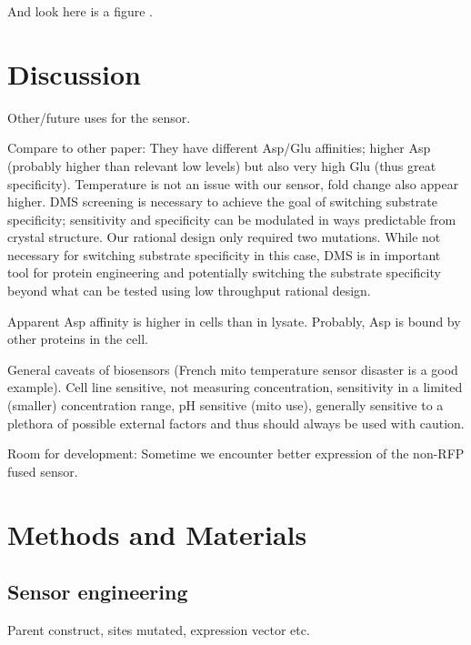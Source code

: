 \documentclass[9pt,lineno]{elife}
\begin{document}
And look here is a figure .













\section{Discussion}
Other/future uses for the sensor.

Compare to other paper:
They have different Asp/Glu affinities; higher Asp (probably higher than relevant low levels) but also very high Glu (thus great specificity). Temperature is not an issue with our sensor, fold change also appear higher.
DMS screening is necessary to achieve the goal of switching substrate specificity; sensitivity and specificity can be modulated in ways predictable from crystal structure. Our rational design only required two mutations. While not necessary for switching substrate specificity in this case, DMS is in important tool for protein engineering and potentially switching the substrate specificity beyond what can be tested using low throughput rational design.

Apparent Asp affinity is higher in cells than in lysate. Probably, Asp is bound by other proteins in the cell.

General caveats of biosensors (French mito temperature sensor disaster is a good example). Cell line sensitive, not measuring concentration, sensitivity in a limited (smaller) concentration range, pH sensitive (mito use), generally sensitive to a plethora of possible external factors and thus should always be used with caution.

Room for development:
Sometime we encounter better expression of the non-RFP fused sensor.










\section{Methods and Materials}

\subsection{Sensor engineering}
Parent construct, sites mutated, expression vector etc.
\end{document}
